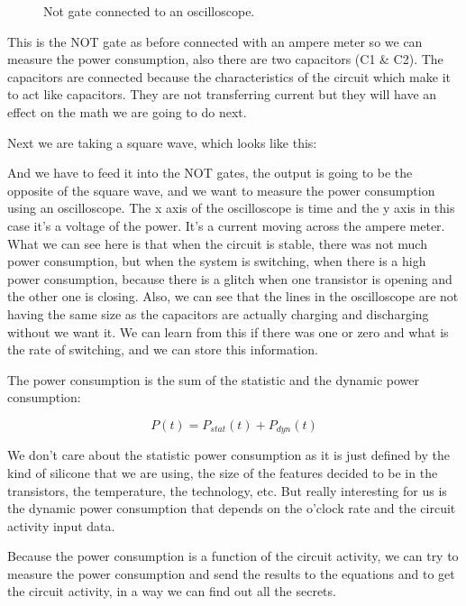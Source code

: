 \begin{figure}[!ht]
    \centering
    
    \caption{Not gate connected to an oscilloscope.} \label{fig:Not gate connected to an oscilloscope}
\end{figure}

This is the NOT gate as before connected with an ampere meter so we can measure
the power consumption, also there are two capacitors (C1 \& C2). The capacitors
are connected because the characteristics of the circuit which make it to act
like capacitors. They are not transferring current but they will have an effect
on the math we are going to do next.

Next we are taking a square wave, which looks like this:

And we have to feed it into the NOT gates, the output is going to be the
opposite of the square wave, and we want to measure the power consumption using
an oscilloscope. The x axis of the oscilloscope is time and the y axis in this
case it's a voltage of the power. It's a current moving across the ampere meter.
What we can see here is that when the circuit is stable, there was not much
power consumption, but when the system is switching, when there is a high power
consumption, because there is a glitch when one transistor is opening and the
other one is closing. Also, we can see that the lines in the oscilloscope are
not having the same size as the capacitors are actually charging and discharging
without we want it. We can learn from this if there was one or zero and what is
the rate of switching, and we can store this information.

The power consumption is the sum of the statistic and the dynamic power
consumption: 

\begin{displaymath}
    P(t)=P_{stat}(t) + P_{dyn}(t)
\end{displaymath}

We don't care about the statistic power consumption as it is just defined by the
kind of silicone that we are using, the size of the features decided to be in
the transistors, the temperature, the technology, etc. But really interesting
for us is the dynamic power consumption that depends on the o'clock rate and the
circuit activity input data.

Because the power consumption is a function of the circuit activity, we can try
to measure the power consumption and send the results to the equations and to
get the circuit activity, in a way we can find out all the secrets.

